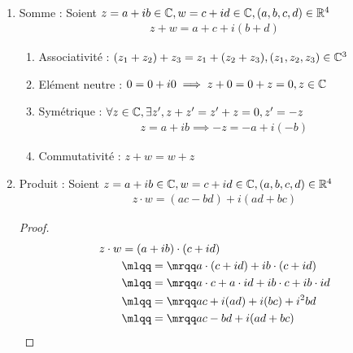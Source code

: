 \begin{proposition}~
\begin{enumerate}
\item Somme : Soient $z = a + ib \in \mathbb{C}, w = c + id \in \mathbb{C}, (a, b, c, d) \in \mathbb{R}^4$
\begin{align*}
z + w = a + c + i (b + d)
\end{align*}

\begin{enumerate}
\item Associativité : $(z_1 + z_2) + z_3 = z_1 + (z_2 + z_3), (z_1, z_2, z_3) \in \mathbb{C}^3$
\item Elément neutre : $0 = 0 + i0 \implies z + 0 = 0 + z = 0, z \in \mathbb{C}$
\item Symétrique : $\forall z \in \mathbb{C}, \exists z', z + z' = z' + z = 0, z' = -z$
\begin{align*}
z = a + ib \implies -z = -a + i(-b)
\end{align*}
\item Commutativité : $z + w = w + z$
\end{enumerate}

\item Produit : Soient $z = a + ib \in \mathbb{C}, w = c + id \in \mathbb{C}, (a, b, c, d) \in \mathbb{R}^4$
\begin{align*}
z \cdot w = (ac - bd) + i(ad + bc)
\end{align*}

\begin{proof}
\begin{align*}
z \cdot w &= (a + ib) \cdot (c + id) \\
          &\mlqq=\mrqq a \cdot (c + id) + ib \cdot (c + id) \\
          &\mlqq=\mrqq a \cdot c + a \cdot id + ib \cdot c + ib \cdot id \\
          &\mlqq=\mrqq ac + i(ad) + i(bc) + i^2 bd \\
          &\mlqq=\mrqq ac - bd + i(ad + bc)
\end{align*}
\end{proof}


\end{enumerate}
\end{proposition}
